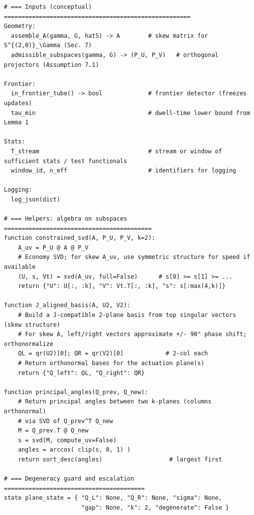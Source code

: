 \documentclass[10pt]{article}
\begin{document}
\begin{lstlisting}
# === Inputs (conceptual) =====================================================
Geometry:
  assemble_A(gamma, G, hatS) -> A        # skew matrix for S^{(2,0)}_\Gamma (Sec. 7)
  admissible_subspaces(gamma, G) -> (P_U, P_V)   # orthogonal projectors (Assumption 7.1)

Frontier:
  in_frontier_tube() -> bool             # frontier detector (freezes updates)
  tau_min                                # dwell-time lower bound from Lemma 1

Stats:
  T_stream                               # stream or window of sufficient stats / test functionals
  window_id, n_eff                       # identifiers for logging

Logging:
  log_json(dict)

# === Helpers: algebra on subspaces ==========================================
function constrained_svd(A, P_U, P_V, k=2):
    A_uv = P_U @ A @ P_V
    # Economy SVD; for skew A_uv, use symmetric structure for speed if available
    (U, s, Vt) = svd(A_uv, full=False)      # s[0] >= s[1] >= ...
    return {"U": U[:, :k], "V": Vt.T[:, :k], "s": s[:max(4,k)]}

function J_aligned_basis(A, U2, V2):
    # Build a J-compatible 2-plane basis from top singular vectors (skew structure)
    # For skew A, left/right vectors approximate +/- 90° phase shift; orthonormalize
    QL = qr(U2)[0]; QR = qr(V2)[0]            # 2-col each
    # Return orthonormal bases for the actuation plane(s)
    return {"Q_left": QL, "Q_right": QR}

function principal_angles(Q_prev, Q_new):
    # Return principal angles between two k-planes (columns orthonormal)
    # via SVD of Q_prev^T Q_new
    M = Q_prev.T @ Q_new
    s = svd(M, compute_uv=False)
    angles = arccos( clip(s, 0, 1) )
    return sort_desc(angles)                   # largest first

# === Degeneracy guard and escalation ========================================
state plane_state = { "Q_L": None, "Q_R": None, "sigma": None,
                      "gap": None, "k": 2, "degenerate": False }


\end{lstlisting}
\end{document}
